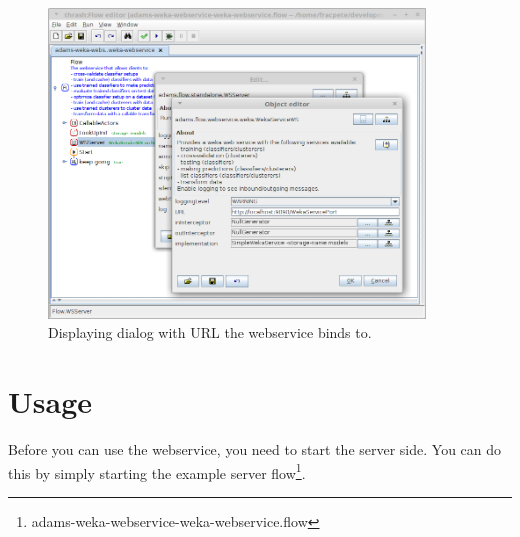 \documentclass[a4paper]{book}
\begin{document}
\begin{figure}[htb]
  \centering
  \includegraphics[width=10.0cm]{images/server_setup.png}
  \caption{Displaying dialog with URL the webservice binds to.}
  \label{server_setup}
\end{figure}

\clearpage
\chapter{Usage}
Before you can use the webservice, you need to start the server side. You can
do this by simply starting the example server 
flow\footnote{adams-weka-webservice-weka-webservice.flow}.
\end{document}
